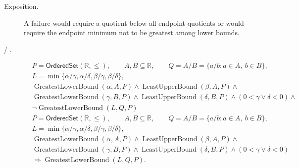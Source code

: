 \begin{remark*}
\begin{description}
  \item[Exposition.]
A failure would require a quotient below all endpoint quotients or would
require the endpoint minimum not to be greatest among lower bounds.


  \item[ / .]

\[
\begin{aligned}
&P=\mathsf{OrderedSet}(\mathbb{R},\leq),\qquad
A,B\subseteq\mathbb{R},\qquad Q=A/B=\{a/b:a\in A,\ b\in B\},\\
&L=\min\{\alpha/\gamma,\alpha/\delta,\beta/\gamma,\beta/\delta\},\\
&\operatorname{GreatestLowerBound}(\alpha,A,P)\land
\operatorname{LeastUpperBound}(\beta,A,P)\land\\
&\operatorname{GreatestLowerBound}(\gamma,B,P)\land
\operatorname{LeastUpperBound}(\delta,B,P)\land
(0<\gamma\lor\delta<0)\land\\
&\neg\operatorname{GreatestLowerBound}(L,Q,P)
\end{aligned}
\]
\[
\begin{aligned}
&P=\mathsf{OrderedSet}(\mathbb{R},\leq),\qquad
A,B\subseteq\mathbb{R},\qquad Q=A/B=\{a/b:a\in A,\ b\in B\},\\
&L=\min\{\alpha/\gamma,\alpha/\delta,\beta/\gamma,\beta/\delta\},\\
&\operatorname{GreatestLowerBound}(\alpha,A,P)\land
\operatorname{LeastUpperBound}(\beta,A,P)\land\\
&\operatorname{GreatestLowerBound}(\gamma,B,P)\land
\operatorname{LeastUpperBound}(\delta,B,P)\land
(0<\gamma\lor\delta<0)\\
&\Longrightarrow \operatorname{GreatestLowerBound}(L,Q,P).
\end{aligned}
\]
\end{description}
\end{remark*}

